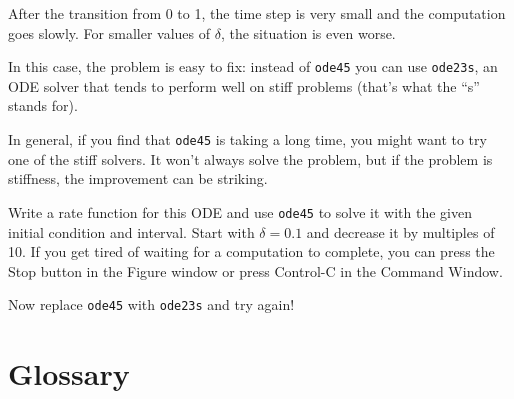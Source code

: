 \documentclass{book}
\begin{document}
After the transition from 0 to 1, the time step is very small and the
computation goes slowly. For smaller values of $\delta$, the
situation is even worse.

In this case, the problem is easy to fix: instead of {\tt ode45} you can
use {\tt ode23s}, an ODE solver that tends to perform well on stiff
problems (that's what the ``s'' stands for).

In general, if you find that {\tt ode45} is taking a long time, you
might want to try one of the stiff solvers. It won't always solve
the problem, but if the problem is stiffness, the improvement can
be striking.

\begin{ex}
Write a rate function for this ODE and use
{\tt ode45} to solve it with the given initial condition and interval.
Start with $\delta = 0.1$ and decrease it by multiples of 10. If
you get tired of waiting for a computation to complete, you can 
press the Stop button in the Figure window or press Control-C in
the Command Window.

Now replace {\tt ode45} with {\tt ode23s} and try again!
\end{ex}



\section{Glossary}
\end{document}
